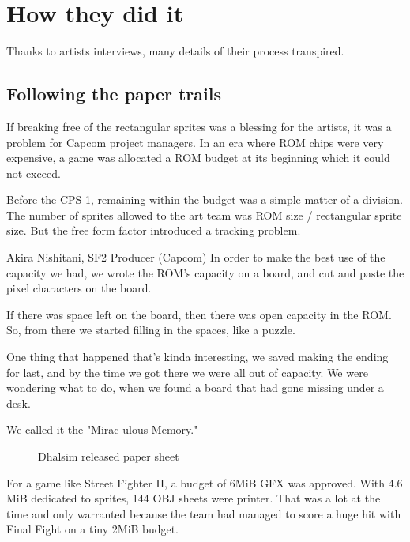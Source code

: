 


\section{How they did it}
Thanks to artists interviews, many details of their process transpired.

\subsection{Following the paper trails}
If breaking free of the rectangular sprites was a blessing for the artists, it was a problem for Capcom project managers. In an era where ROM chips were very expensive, a game was allocated a ROM budget at its beginning which it could not exceed.

Before the CPS-1, remaining within the budget was a simple matter of a division. The number of sprites allowed to the art team was ROM size / rectangular sprite size. But the free form factor introduced a tracking problem.

\begin{q}{Akira Nishitani, SF2 Producer (Capcom)}
In order to make the best use of the capacity we had, we wrote the ROM’s capacity on a board, and cut and paste the pixel characters on the board.

If there was space left on the board, then there was open capacity in the ROM. So, from there we started filling in the spaces, like a puzzle.

One thing that happened that's kinda interesting, we saved making the ending for last, and by the time we got there we were all out of capacity. We were wondering what to do, when we found a board that had gone missing under a desk.

We called it the "Mirac-ulous Memory."
\end{q}



 \begin{figure}[H]
\caption*{Dhalsim released paper sheet}
\end{figure}

For a game like Street Fighter II, a budget of 6MiB GFX was approved. With 4.6 MiB dedicated to sprites, 144 OBJ sheets were printer. That was a lot at the time and only warranted because the team had managed to score a huge hit with Final Fight on a tiny 2MiB budget. 

